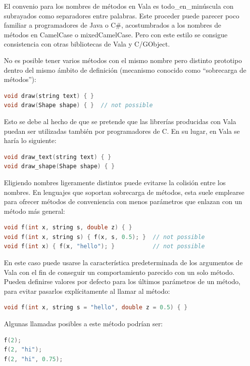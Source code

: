 \documentclass[12pt,twoside]{book}
\begin{document}
El convenio para los nombres de métodos en Vala es todo\_en\_minúscula con subrayados como separadores entre palabras. Este proceder puede parecer poco familiar a programadores de Java o C\#, acostumbrados a los nombres de métodos en CamelCase o mixedCamelCase. Pero con este estilo se consigue consistencia con otras bibliotecas de Vala y C/GObject.

No es posible tener varios métodos con el mismo nombre pero distinto prototipo dentro del mismo ámbito de definición (mecanismo conocido como ``sobrecarga de métodos''):

\begin{lstlisting}[language=C++]
void draw(string text) { }
void draw(Shape shape) { }  // not possible
\end{lstlisting}


Esto se debe al hecho de que se pretende que las librerías producidas con Vala puedan ser utilizadas también por programadores de C. En su lugar, en Vala se haría lo siguiente:

\begin{lstlisting}[language=C++]
void draw_text(string text) { }
void draw_shape(Shape shape) { }
\end{lstlisting}

Eligiendo nombres ligeramente distintos puede evitarse la colisión entre los nombres. En lenguajes que soportan sobrecarga de métodos, esta suele emplearse para ofrecer métodos de conveniencia con menos parámetros que enlazan con un método más general:

\begin{lstlisting}[language=C++]
void f(int x, string s, double z) { }
void f(int x, string s) { f(x, s, 0.5); }  // not possible
void f(int x) { f(x, "hello"); }           // not possible
\end{lstlisting}

En este caso puede usarse la característica predeterminada de los argumentos de Vala con el fin de conseguir un comportamiento parecido con un solo método. Pueden definirse valores por defecto para los últimos parámetros de un método, para evitar pasarlos explícitamente al llamar al método:


\begin{lstlisting}[language=C++]
void f(int x, string s = "hello", double z = 0.5) { }
\end{lstlisting}

Algunas llamadas posibles a este método podrían ser:

\begin{lstlisting}[language=C++]
f(2);
f(2, "hi");
f(2, "hi", 0.75);
\end{lstlisting}
\end{document}
